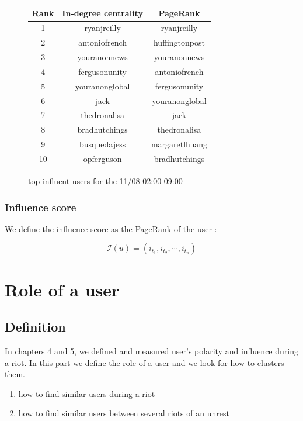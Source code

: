 \documentclass[a4paper,12pt]{report}
\begin{document}
\begin{figure}[H]
  \centering
\begin{tabular}{ccc}
\hline
Rank & \textbf{In-degree centrality} & \textbf{PageRank}\\ \hline \hline
1 & ryanjreilly & ryanjreilly \\ \hline
2 & antoniofrench & \cellcolor{red!20} huffingtonpost \\ \hline
3 & youranonnews & youranonnews \\ \hline
4 & fergusonunity & antoniofrench \\ \hline
5 & youranonglobal & fergusonunity \\ \hline
6 & jack & youranonglobal \\ \hline
7 & thedronalisa & jack \\ \hline
8 & bradhutchings & thedronalisa \\ \hline
9 & \cellcolor{red!20}busquedajess & \cellcolor{red!20}margaretlhuang \\ \hline
10 & \cellcolor{red!20}opferguson & bradhutchings \\ \hline
\hline
\end{tabular}
\caption{top influent users for the 11/08 02:00-09:00}
\end{figure}
	
\newpage

\subsection{Influence score}
We define the influence score as the PageRank of the user : 

$$ \mathcal{I}(u) = (i_{t_1},i_{t_2},\cdots,i_{t_n}) $$

\chapter{Role of a user}

\section{Definition}
In chapters 4 and 5, we defined and measured user's polarity and influence during a riot. In this part we define the role of a user and we look for how to clusters them.

\begin{enumerate}
\item how to find similar users during a riot
\item how to find similar users between several riots of an unrest
\end{enumerate}
\end{document}
